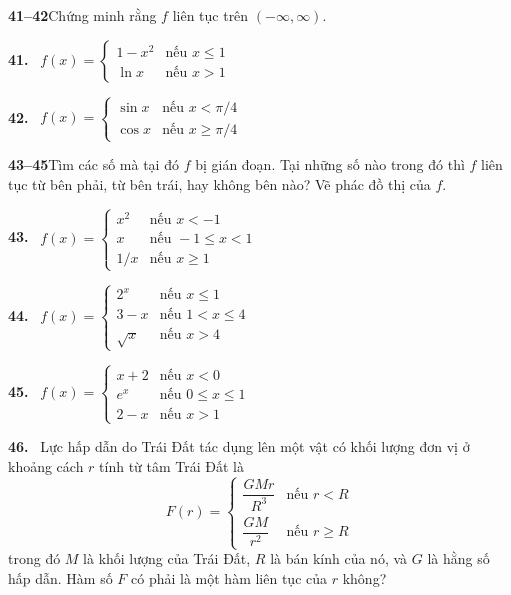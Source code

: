 \hfill
\begin{minipage}[t]{0.485\textwidth}

\noindent
\textbf{\color{stewartcyan}41--42}\enspace Chứng minh rằng $f$ liên tục trên $(-\infty, \infty)$.

\vspace{5pt}
\noindent
\textbf{41.} \ $f(x) = \begin{cases} 1 - x^2 & \text{nếu } x \le 1 \\ \ln x & \text{nếu } x > 1 \end{cases}$

\vspace{7pt}
\noindent
\textbf{42.} \ $f(x) = \begin{cases} \sin x & \text{nếu } x < \pi/4 \\ \cos x & \text{nếu } x \ge \pi/4 \end{cases}$

\vspace{9pt}
\noindent
\textbf{\color{stewartcyan}43--45}\enspace Tìm các số mà tại đó $f$ bị gián đoạn. Tại những số nào trong đó thì $f$ liên tục từ bên phải, từ bên trái, hay không bên nào? Vẽ phác đồ thị của $f$.

\vspace{5pt}
\noindent
\textbf{43.} \ $f(x) = \begin{cases} x^2 & \text{nếu } x < -1 \\ x & \text{nếu } -1 \le x < 1 \\ 1/x & \text{nếu } x \ge 1 \end{cases}$

\vspace{7pt}
\noindent
\textbf{44.} \ $f(x) = \begin{cases} 2^x & \text{nếu } x \le 1 \\ 3 - x & \text{nếu } 1 < x \le 4 \\ \sqrt{x} & \text{nếu } x > 4 \end{cases}$

\vspace{7pt}
\noindent
\textbf{45.} \ $f(x) = \begin{cases} x + 2 & \text{nếu } x < 0 \\ e^x & \text{nếu } 0 \le x \le 1 \\ 2 - x & \text{nếu } x > 1 \end{cases}$

\vspace{9pt}
\noindent
\textbf{46.} \ Lực hấp dẫn do Trái Đất tác dụng lên một vật có khối lượng đơn vị ở khoảng cách $r$ tính từ tâm Trái Đất là
\[
F(r) = \begin{cases}
\dfrac{GMr}{R^3} & \text{nếu } r < R \\[9pt]
\dfrac{GM}{r^2} & \text{nếu } r \ge R
\end{cases}
\]
trong đó $M$ là khối lượng của Trái Đất, $R$ là bán kính của nó, và $G$ là hằng số hấp dẫn. Hàm số $F$ có phải là một hàm liên tục của $r$ không?


\end{minipage}
